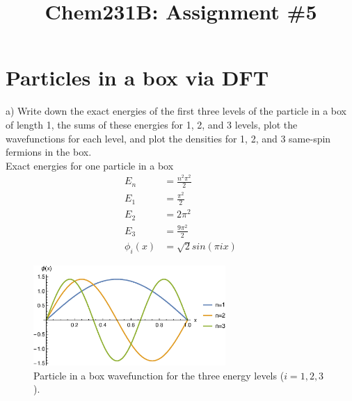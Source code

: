 \documentclass{article}
\title{Chem231B: Assignment \#5} %
\begin{document}
\maketitle

\section*{Particles in a box via DFT}

\noindent a) Write down the exact energies of the first three levels of
the particle in a box of length 1, the sums of these energies for 1, 2,
and 3 levels, plot the wavefunctions for each level, and plot the densities
for 1, 2, and 3 same-spin fermions in the box.
\\

{\color{blue}
  Exact energies for one particle in a box
  \begin{align}
    E_n & = \frac{n^2\pi^2}{2} \\
    E_1 & = \frac{\pi^2}{2} \\
    E_2 & = 2\pi^2 \\
    E_3 & = \frac{9\pi^2}{2} \\
    \phi_i(x) & = \sqrt{2}sin(\pi i x)
  \end{align}
}
\begin{figure}[H]
  \centering
  \includegraphics[width=0.65\textwidth]{box_wave.eps}
  \caption{Particle in a box wavefunction for
    the three energy levels ($i=1,2,3$).}
  \label{fig:box_wave}
\end{figure}
\end{document}
